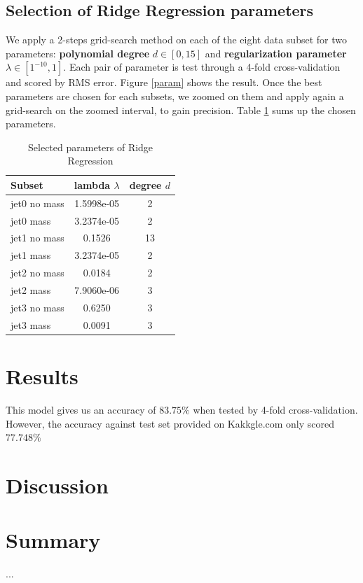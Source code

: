 \documentclass[10pt,conference,compsocconf]{IEEEtran}
\begin{document}
\subsection{Selection of Ridge Regression parameters}
We apply a 2-steps grid-search method on each of the eight data subset for two parameters: \textbf{polynomial degree} $d \in [0, 15]$ and \textbf{regularization parameter} $\lambda \in [1^{-10}, 1]$.  Each pair of parameter is test through a 4-fold cross-validation and scored by RMS error. Figure \ref{param} shows the result. Once the best parameters are chosen for each subsets, we zoomed on them and apply again a grid-search on the zoomed interval, to gain precision. Table \ref{tab:param} sums up the chosen parameters.

\begin{table}[htbp]
  \centering
  \begin{tabular}[c]{| l| | c | c |}
    \hline
    Subset 	& lambda $\lambda$ & degree $d$ \\
    \hline \hline
    jet0 no mass 			& 1.5998e-05	& 2		\\
    jet0 mass 				& 3.2374e-05	& 2		\\
    jet1 no mass				& 0.1526		& 13 		\\
    jet1 mass				& 3.2374e-05 	& 2 		\\
    jet2 no mass				& 0.0184		& 2		\\
    jet2 mass				& 7.9060e-06	& 3		\\
    jet3 no mass				& 0.6250		& 3		\\
    jet3 mass				& 0.0091		& 3		\\
    \hline
  \end{tabular}
  \caption{Selected parameters of Ridge Regression}
  \label{tab:param}
\end{table}




\section{Results}
This model gives us an accuracy of $83.75 \%$ when tested by 4-fold cross-validation. However, the accuracy against test set provided on Kakkgle.com only scored $77.748\%$


\section{Discussion}


\section{Summary}

...




\end{document}
